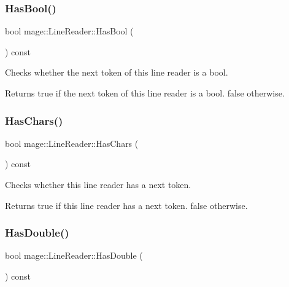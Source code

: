 \subsubsection{\texorpdfstring{Has\+Bool()}{HasBool()}}
{\footnotesize\ttfamily bool mage\+::\+Line\+Reader\+::\+Has\+Bool (\begin{DoxyParamCaption}{ }\end{DoxyParamCaption}) const\hspace{0.3cm}{\ttfamily [protected]}}

Checks whether the next token of this line reader is a {\ttfamily bool}.

\begin{DoxyReturn}{Returns}
{\ttfamily true} if the next token of this line reader is a {\ttfamily bool}. {\ttfamily false} otherwise. 
\end{DoxyReturn}
\hypertarget{classmage_1_1_line_reader_a7eb54d60902d1fb7846ea5c566312a0f}{}\label{classmage_1_1_line_reader_a7eb54d60902d1fb7846ea5c566312a0f} 
\subsubsection{\texorpdfstring{Has\+Chars()}{HasChars()}}
{\footnotesize\ttfamily bool mage\+::\+Line\+Reader\+::\+Has\+Chars (\begin{DoxyParamCaption}{ }\end{DoxyParamCaption}) const\hspace{0.3cm}{\ttfamily [protected]}}

Checks whether this line reader has a next token.

\begin{DoxyReturn}{Returns}
{\ttfamily true} if this line reader has a next token. {\ttfamily false} otherwise. 
\end{DoxyReturn}
\hypertarget{classmage_1_1_line_reader_ad6eb5eaf990bba426498d11c53bd31cd}{}\label{classmage_1_1_line_reader_ad6eb5eaf990bba426498d11c53bd31cd} 
\subsubsection{\texorpdfstring{Has\+Double()}{HasDouble()}}
{\footnotesize\ttfamily bool mage\+::\+Line\+Reader\+::\+Has\+Double (\begin{DoxyParamCaption}{ }\end{DoxyParamCaption}) const\hspace{0.3cm}{\ttfamily [protected]}}

